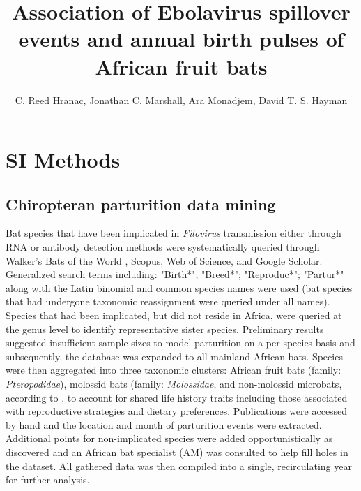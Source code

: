 \documentclass[9pt,twoside,lineno]{pnas-new}
\title{Association of Ebolavirus spillover events and annual birth pulses of African fruit bats}
\author{C. Reed Hranac, Jonathan C. Marshall, Ara Monadjem, David T. S. Hayman}
\begin{document}

\maketitle

\SItext


\section*{SI Methods}
\label{SI methods}

\subsection*{Chiropteran parturition data mining}
\label{dataMining}
Bat species that have been implicated in \textit{Filovirus} transmission either through RNA or antibody detection methods \cite{Han2016UndiscoveredFiloviruses,Walsh2005Wave-likeZaire} were systematically queried through Walker's Bats of the World \cite{Nowak1994WalkersWorld}, Scopus, Web of Science, and Google Scholar. Generalized search terms including: "Birth*"; "Breed*"; "Reproduc*"; "Partur*" along with the Latin binomial and common species names were used (bat species that had undergone taxonomic reassignment were queried under all names). Species that had been implicated, but did not reside in Africa, were queried at the genus level to identify representative sister species. Preliminary results suggested insufficient sample sizes to model parturition on a per-species basis and subsequently, the database was expanded to all mainland African bats. Species were then aggregated into three taxonomic clusters: African fruit bats (family: \textit{Pteropodidae}), molossid bats (family: \textit{Molossidae}, and non-molossid microbats, according to \cite{Cumming1997RainfallBats}, to account for shared life history traits including those associated with reproductive strategies and dietary preferences. Publications were accessed by hand and the location and month of parturition events were extracted. Additional points for non-implicated species were added opportunistically as discovered and an African bat specialist (AM) was consulted to help fill holes in the dataset. All gathered data was then compiled into a single, recirculating year for further analysis.\par
\end{document}
